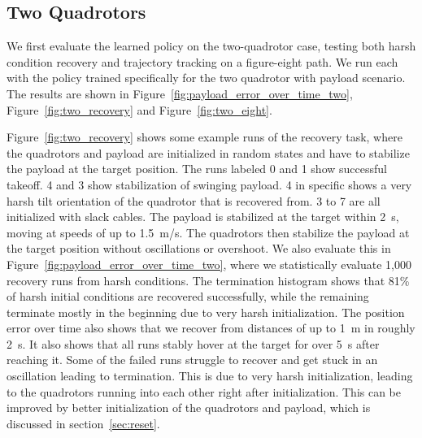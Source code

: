 \subsection{Two Quadrotors}
We first evaluate the learned policy on the two-quadrotor case, testing both harsh condition recovery and trajectory tracking on a figure-eight path. We run each with the policy trained specifically for the two quadrotor with payload scenario. The results are shown in Figure~\ref{fig:payload_error_over_time_two}, Figure~\ref{fig:two_recovery} and Figure~\ref{fig:two_eight}.

Figure~\ref{fig:two_recovery} shows some example runs of the recovery task, where the quadrotors and payload are initialized in random states and have to stabilize the payload at the target position. The runs labeled 0 and 1 show successful takeoff. 4 and 3 show stabilization of swinging payload. 4 in specific shows a very harsh tilt orientation of the quadrotor that is recovered from. 3 to 7 are all initialized with slack cables. The payload is stabilized at the target within 2~s, moving at speeds of up to 1.5~m/s. The quadrotors then stabilize the payload at the target position without oscillations or overshoot.
We also evaluate this in Figure~\ref{fig:payload_error_over_time_two}, where we statistically evaluate 1,000 recovery runs from harsh conditions. The termination histogram shows that 81\% of harsh initial conditions are recovered successfully, while the remaining terminate mostly in the beginning due to very harsh initialization. The position error over time also shows that we recover from distances of up to 1~m in roughly 2~s. It also shows that all runs stably hover at the target for over 5~s after reaching it. Some of the failed runs struggle to recover and get stuck in an oscillation leading to termination. This is due to very harsh initialization, leading to the quadrotors running into each other right after initialization. This can be improved by better initialization of the quadrotors and payload, which is discussed in section~\ref{sec:reset}.

